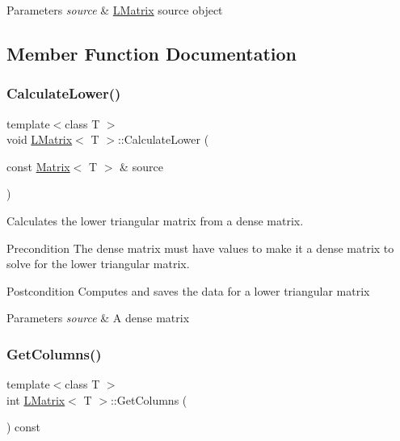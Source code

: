 \begin{DoxyParams}{Parameters}
{\em source} & \mbox{\hyperlink{class_l_matrix}{L\+Matrix}} source object \\
\hline
\end{DoxyParams}


\subsection{Member Function Documentation}
\mbox{\label{class_l_matrix_a9a70080e771867dd76c983fe1f8c2c15}} 
\subsubsection{\texorpdfstring{CalculateLower()}{CalculateLower()}}
{\footnotesize\ttfamily template$<$class T $>$ \\
void \mbox{\hyperlink{class_l_matrix}{L\+Matrix}}$<$ T $>$\+::Calculate\+Lower (\begin{DoxyParamCaption}\item[{const \mbox{\hyperlink{class_matrix}{Matrix}}$<$ T $>$ \&}]{source }\end{DoxyParamCaption})}



Calculates the lower triangular matrix from a dense matrix. 

\begin{DoxyPrecond}{Precondition}
The dense matrix must have values to make it a dense matrix to solve for the lower triangular matrix. 
\end{DoxyPrecond}
\begin{DoxyPostcond}{Postcondition}
Computes and saves the data for a lower triangular matrix
\end{DoxyPostcond}

\begin{DoxyParams}{Parameters}
{\em source} & A dense matrix \\
\hline
\end{DoxyParams}
\mbox{\label{class_l_matrix_ae7adc0f92e3648751fe49852ad158ea2}} 
\subsubsection{\texorpdfstring{GetColumns()}{GetColumns()}}
{\footnotesize\ttfamily template$<$class T $>$ \\
int \mbox{\hyperlink{class_l_matrix}{L\+Matrix}}$<$ T $>$\+::Get\+Columns (\begin{DoxyParamCaption}{ }\end{DoxyParamCaption}) const\hspace{0.3cm}{\ttfamily [virtual]}}



